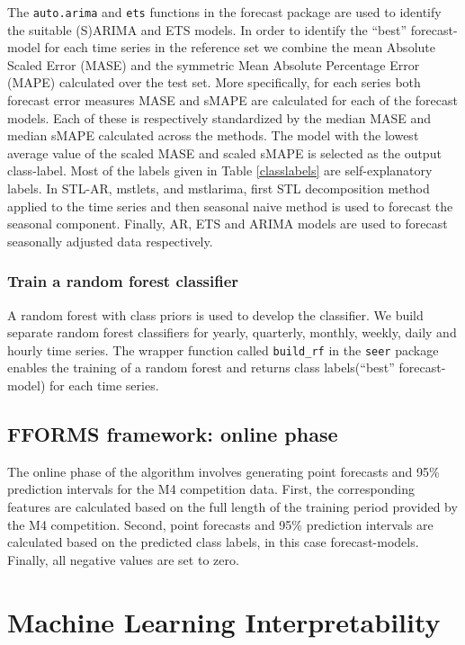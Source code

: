 \documentclass[11pt,a4paper,]{article}
\theoremstyle{definition}
\theoremstyle{definition}
\theoremstyle{definition}
\theoremstyle{remark}
\begin{document}
The \texttt{auto.arima} and \texttt{ets} functions in the forecast
package are used to identify the suitable (S)ARIMA and ETS models. In
order to identify the ``best'' forecast-model for each time series in
the reference set we combine the mean Absolute Scaled Error (MASE) and
the symmetric Mean Absolute Percentage Error (MAPE) calculated over the
test set. More specifically, for each series both forecast error
measures MASE and sMAPE are calculated for each of the forecast models.
Each of these is respectively standardized by the median MASE and median
sMAPE calculated across the methods. The model with the lowest average
value of the scaled MASE and scaled sMAPE is selected as the output
class-label. Most of the labels given in Table \ref{classlabels} are
self-explanatory labels. In STL-AR, mstlets, and mstlarima, first STL
decomposition method applied to the time series and then seasonal naive
method is used to forecast the seasonal component. Finally, AR, ETS and
ARIMA models are used to forecast seasonally adjusted data respectively.

\subsubsection{Train a random forest
classifier}\label{train-a-random-forest-classifier}

A random forest with class priors is used to develop the classifier. We
build separate random forest classifiers for yearly, quarterly, monthly,
weekly, daily and hourly time series. The wrapper function called
\texttt{build\_rf} in the \texttt{seer} package enables the training of
a random forest and returns class labels(``best'' forecast-model) for
each time series.

\subsection{FFORMS framework: online
phase}\label{fforms-framework-online-phase}

The online phase of the algorithm involves generating point forecasts
and 95\% prediction intervals for the M4 competition data. First, the
corresponding features are calculated based on the full length of the
training period provided by the M4 competition. Second, point forecasts
and 95\% prediction intervals are calculated based on the predicted
class labels, in this case forecast-models. Finally, all negative values
are set to zero.

\section{Machine Learning Interpretability}\label{machinelearning}
\end{document}
